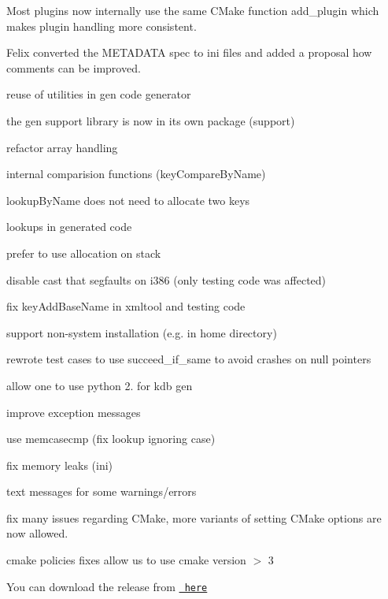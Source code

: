 Most plugins now internally use the same C\+Make function {\ttfamily add\+\_\+plugin} which makes plugin handling more consistent.

Felix converted the M\+E\+T\+A\+D\+A\+TA spec to ini files and added a proposal how comments can be improved.


\begin{DoxyItemize}
\item reuse of utilities in gen code generator
\item the gen support library is now in its own package ({\ttfamily support})
\item refactor array handling
\item internal comparision functions (key\+Compare\+By\+Name)
\end{DoxyItemize}


\begin{DoxyItemize}
\item lookup\+By\+Name does not need to allocate two keys
\item lookups in generated code
\item prefer to use allocation on stack
\end{DoxyItemize}


\begin{DoxyItemize}
\item disable cast that segfaults on i386 (only testing code was affected)
\item fix key\+Add\+Base\+Name in xmltool and testing code
\item support non-\/system installation (e.\+g. in home directory)
\item rewrote test cases to use succeed\+\_\+if\+\_\+same to avoid crashes on null pointers
\item allow one to use python 2. for kdb gen
\item improve exception messages
\item use memcasecmp (fix lookup ignoring case)
\item fix memory leaks (ini)
\item text messages for some warnings/errors
\item fix many issues regarding C\+Make, more variants of setting C\+Make options are now allowed.
\item cmake policies fixes allow us to use cmake version $>$ 3
\end{DoxyItemize}

You can download the release from \href{http://www.markus-raab.org/ftp/elektra/releases/elektra-0.8.9.tar.gz}{\texttt{ here}}



